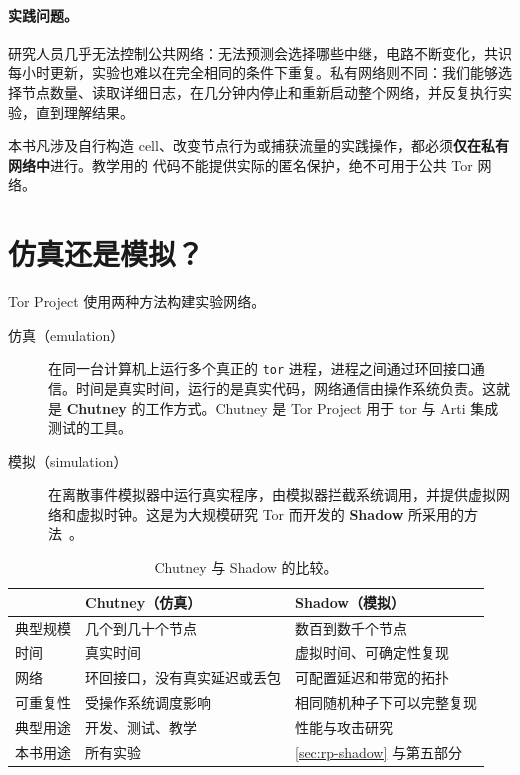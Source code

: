 \paragraph{实践问题。}研究人员几乎无法控制公共网络：无法预测会选择哪些中继，电路不断变化，共识每小时更新，实验也难以在完全相同的条件下重复。私有网络则不同：我们能够选择节点数量、读取详细日志，在几分钟内停止和重新启动整个网络，并反复执行实验，直到理解结果。

\begin{attenzione}[实验规则]
本书凡涉及自行构造 cell、改变节点行为或捕获流量的实践操作，都必须\textbf{仅在私有网络中}进行。教学用的  代码不能提供实际的匿名保护，绝不可用于公共 Tor 网络。
\end{attenzione}

\section{仿真还是模拟？}\label{sec:rp-strumenti}

Tor Project 使用两种方法构建实验网络。

\begin{description}
  \item[仿真（emulation）] 在同一台计算机上运行多个真正的 \texttt{tor} 进程，进程之间通过环回接口通信。时间是真实时间，运行的是真实代码，网络通信由操作系统负责。这就是 \textbf{Chutney} 的工作方式。Chutney 是 Tor Project 用于 tor 与 Arti 集成测试的工具。
  \item[模拟（simulation）] 在离散事件模拟器中运行真实程序，由模拟器拦截系统调用，并提供虚拟网络和虚拟时钟。这是为大规模研究 Tor 而开发的 \textbf{Shadow} 所采用的方法~\cite{jansen2012shadow}。
\end{description}

\begin{table}[htbp]
\centering\small
\begin{tabularx}{\textwidth}{@{}l>{\raggedright\arraybackslash}X>{\raggedright\arraybackslash}X@{}}
\toprule
 & Chutney（仿真） & Shadow（模拟） \\
\midrule
典型规模 & 几个到几十个节点 & 数百到数千个节点 \\
时间 & 真实时间 & 虚拟时间、可确定性复现 \\
网络 & 环回接口，没有真实延迟或丢包 & 可配置延迟和带宽的拓扑 \\
可重复性 & 受操作系统调度影响 & 相同随机种子下可以完整复现 \\
典型用途 & 开发、测试、教学 & 性能与攻击研究 \\
本书用途 & 所有实验 & \cref{sec:rp-shadow} 与第五部分 \\
\bottomrule
\end{tabularx}
\caption{Chutney 与 Shadow 的比较。}
\label{tab:chutney-shadow}
\end{table}


